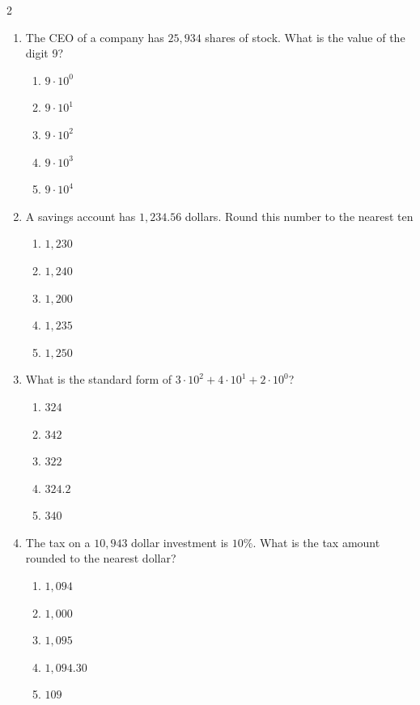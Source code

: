 \documentclass[10pt]{article}
\begin{document}
\begin{multicols}{2}
\begin{enumerate}[label=\textbf{Q\arabic*.}, leftmargin=*, itemsep=6pt, parsep=0pt]
  \item \small The CEO of a company has $25,934$ shares of stock. What is the value of the digit 9?
  \begin{enumerate}[label=(\Alph*), leftmargin=0.6cm, nosep, itemsep=2pt]
    \item $9\cdot10^0$
    \item $9\cdot10^1$
    \item $9\cdot10^2$
    \item $9\cdot10^3$
    \item $9\cdot10^4$
  \end{enumerate}

  \item \small A savings account has $1,234.56$ dollars. Round this number to the nearest ten
  \begin{enumerate}[label=(\Alph*), leftmargin=0.6cm, nosep, itemsep=2pt]
    \item $1,230$
    \item $1,240$
    \item $1,200$
    \item $1,235$
    \item $1,250$
  \end{enumerate}

  \item \small What is the standard form of $3\cdot10^2+4\cdot10^1+2\cdot10^0$?
  \begin{enumerate}[label=(\Alph*), leftmargin=0.6cm, nosep, itemsep=2pt]
    \item $324$
    \item $342$
    \item $322$
    \item $324.2$
    \item $340$
  \end{enumerate}

  \item \small The tax on a $10,943$ dollar investment is $10\%$. What is the tax amount rounded to the nearest dollar?
  \begin{enumerate}[label=(\Alph*), leftmargin=0.6cm, nosep, itemsep=2pt]
    \item $1,094$
    \item $1,000$
    \item $1,095$
    \item $1,094.30$
    \item $109$
  \end{enumerate}


\end{enumerate}
\end{multicols}
\end{document}

